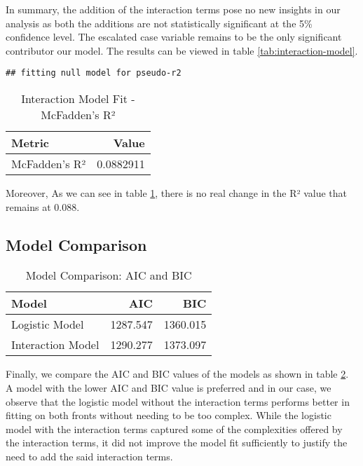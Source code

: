 \documentclass[
]{article}
\begin{document}
In summary, the addition of the interaction terms pose no new insights in our analysis as both the additions are not statistically significant at the 5\% confidence level. The escalated case variable remains to be the only significant contributor our model. The results can be viewed in table \ref{tab:interaction-model}.

\begin{verbatim}
## fitting null model for pseudo-r2
\end{verbatim}

\begin{table}

\caption{\label{tab:interaction-squared}Interaction Model Fit - McFadden’s R²}
\centering
\begin{tabular}[t]{l|r}
\hline
Metric & Value\\
\hline
McFadden's R² & 0.0882911\\
\hline
\end{tabular}
\end{table}

Moreover, As we can see in table \ref{tab:interaction-squared}, there is no real change in the R² value that remains at 0.088.

\subsection{Model Comparison}\label{model-comparison}

\begin{table}

\caption{\label{tab:model-compare}Model Comparison: AIC and BIC}
\centering
\begin{tabular}[t]{l|r|r}
\hline
Model & AIC & BIC\\
\hline
Logistic Model & 1287.547 & 1360.015\\
\hline
Interaction Model & 1290.277 & 1373.097\\
\hline
\end{tabular}
\end{table}

Finally, we compare the AIC and BIC values of the models as shown in table \ref{tab:model-compare}. A model with the lower AIC and BIC value is preferred and in our case, we observe that the logistic model without the interaction terms performs better in fitting on both fronts without needing to be too complex. While the logistic model with the interaction terms captured some of the complexities offered by the interaction terms, it did not improve the model fit sufficiently to justify the need to add the said interaction terms.
\end{document}
